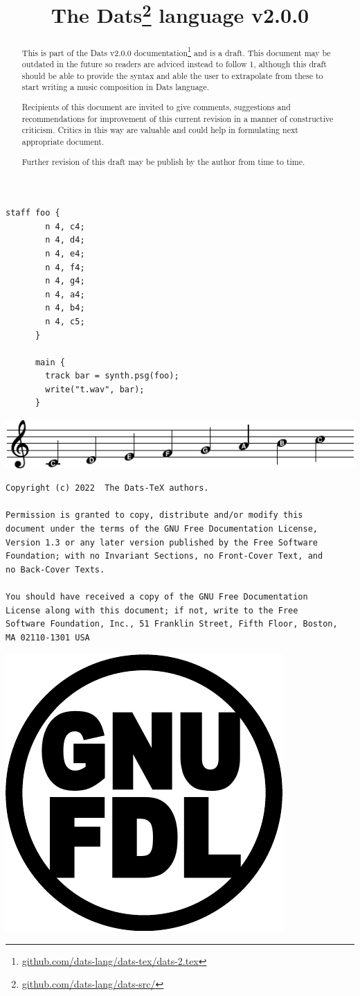 \documentclass[10pt, twoside]{article}
\title{\textbf{The Dats\thanks{\url{github.com/dats-lang/dats-src/}} language v2.0.0}}
\begin{document}
\maketitle
\thispagestyle{fancy}

\begin{Verbatim}[frame=single, label=The "Hello World" of Dats]
      staff foo {
        n 4, c4;
        n 4, d4;
        n 4, e4;
        n 4, f4;
        n 4, g4;
        n 4, a4;
        n 4, b4;
        n 4, c5;
      }

      main {
        track bar = synth.psg(foo);
        write("t.wav", bar);
      }
\end{Verbatim}
\begin{center}
\includegraphics{notes/cdefgabc}
\end{center}

\vspace{0.5in}
\begin{abstract}
This is part of the Dats v2.0.0 documentation\footnote{\url{github.com/dats-lang/dats-tex/dats-2.tex}}
and is a draft. This document may be outdated in the future so readers are adviced instead to
follow 1, although this draft should be able to provide the syntax and able the user to
extrapolate from these to start writing a music composition in Dats language.

Recipients of this document are invited to give comments, suggestions and recommendations
for improvement of this current revision in a manner of constructive criticism.
Critics in this way are valuable and could help in formulating next appropriate
document.

Further revision of this draft may be publish by the author from time to time.
\end{abstract}

\clearpage
\vspace*{6in}

\begin{minipage}[t]{5in}
\begin{Verbatim}[fontsize=\small]
Copyright (c) 2022  The Dats-TeX authors.

Permission is granted to copy, distribute and/or modify this
document under the terms of the GNU Free Documentation License,
Version 1.3 or any later version published by the Free Software
Foundation; with no Invariant Sections, no Front-Cover Text, and
no Back-Cover Texts. 

You should have received a copy of the GNU Free Documentation
License along with this document; if not, write to the Free
Software Foundation, Inc., 51 Franklin Street, Fifth Floor, Boston,
MA 02110-1301 USA
\end{Verbatim}
\bigskip

\indent \includegraphics[width=.5in]{fdl.pdf}
\end{minipage}
\end{document}

